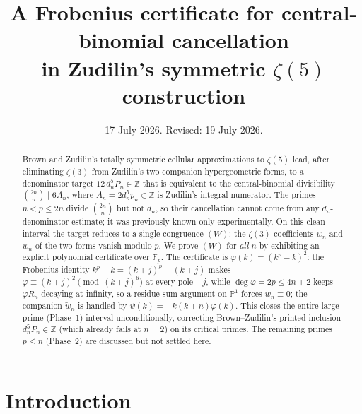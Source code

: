 \documentclass[11pt]{article}
\title{A Frobenius certificate for central-binomial cancellation\\
in Zudilin's symmetric $\zeta(5)$ construction}
\author{}
\date{17 July 2026. Revised: 19 July 2026.}
\theoremstyle{definition}
\newcommand{\Fp}{\mathbb{F}_p}
\newcommand{\Z}{\mathbb{Z}}
\newcommand{\bin}[2]{\binom{#1}{#2}}
\newcommand{\wt}{\widetilde}
\begin{document}
\maketitle

\begin{abstract}
Brown and Zudilin's totally symmetric cellular approximations to $\zeta(5)$
lead, after eliminating $\zeta(3)$ from Zudilin's two companion hypergeometric
forms, to a denominator target $12\,d_n^5 P_n\in\Z$ that is equivalent to the
central-binomial divisibility $\bin{2n}{n}\mid 6A_n$, where $A_n=2d_n^5 p_n\in\Z$
is Zudilin's integral numerator. The primes $n<p\le 2n$ divide $\bin{2n}{n}$ but
not $d_n$, so their cancellation cannot come from any $d_n$-denominator estimate;
it was previously known only experimentally. On this clean interval the target
reduces to a single congruence $(W)$: the $\zeta(3)$-coefficients $w_n$ and
$\wt w_n$ of the two forms vanish modulo $p$. We prove $(W)$ for \emph{all} $n$
by exhibiting an explicit polynomial certificate over $\Fp$. The certificate is
$\varphi(k)=(k^p-k)^2$: the Frobenius identity $k^p-k=(k+j)^p-(k+j)$ makes
$\varphi\equiv (k+j)^2 \pmod{(k+j)^6}$ at every pole $-j$, while $\deg\varphi=2p\le
4n+2$ keeps $\varphi R_n$ decaying at infinity, so a residue-sum argument on
$\mathbb P^1$ forces $w_n\equiv 0$; the companion $\wt w_n$ is handled by
$\psi(k)=-k(k+n)\varphi(k)$. This closes the entire large-prime (Phase~1)
interval unconditionally, correcting Brown--Zudilin's printed inclusion
$d_n^5P_n\in\Z$ (which already fails at $n=2$) on its critical primes. The
remaining primes $p\le n$ (Phase~2) are discussed but not settled here.
\end{abstract}

\section{Introduction}
\end{document}
